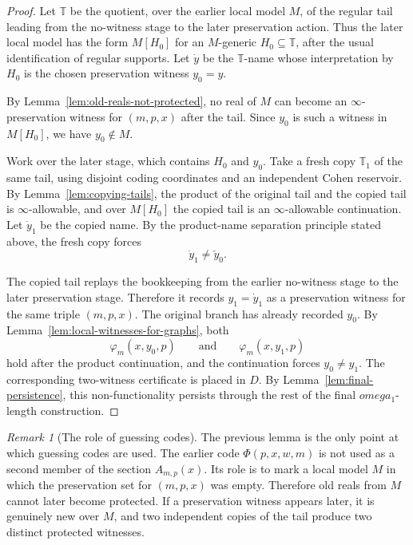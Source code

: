 \documentclass{article}
\theoremstyle{remark}
\newtheorem{remark}[theorem]{Remark}
\theoremstyle{plain}
\def\omega{omega}%
\begin{document}
\begin{proof}
Let $\mathbb T$ be the quotient, over the earlier local model $M$, of the regular
tail leading from the no-witness stage to the later preservation action. Thus
the later local model has the form $M[H_0]$ for an $M$-generic
$H_0\subseteq\mathbb T$, after the usual identification of regular supports. Let
$\dot y$ be the $\mathbb T$-name whose interpretation by $H_0$ is the chosen
preservation witness $y_0=y$.

By Lemma~\ref{lem:old-reals-not-protected}, no real of $M$ can become an
$\infty$-preservation witness for $(m,p,x)$ after the tail. Since $y_0$ is such a
witness in $M[H_0]$, we have $y_0\notin M$.

Work over the later stage, which contains $H_0$ and $y_0$. Take a fresh copy
$\mathbb T_1$ of the same tail, using disjoint coding coordinates and an
independent Cohen reservoir. By Lemma~\ref{lem:copying-tails}, the product of
the original tail and the copied tail is $\infty$-allowable, and over
$M[H_0]$ the copied tail is an $\infty$-allowable continuation. Let $\dot y_1$ be
the copied name. By the product-name separation principle stated above, the fresh copy
forces
\[
   \dot y_1\neq \check y_0.
\]

The copied tail replays the bookkeeping from the earlier no-witness stage to the
later preservation stage. Therefore it records $y_1=\dot y_1$ as a preservation
witness for the same triple $(m,p,x)$. The original branch has already recorded
$y_0$. By Lemma~\ref{lem:local-witnesses-for-graphs}, both
\[
   \varphi_m(x,y_0,p)
   \qquad\text{and}\qquad
   \varphi_m(x,y_1,p)
\]
hold after the product continuation, and the continuation forces
$y_0\neq y_1$. The corresponding two-witness certificate is placed in $D$. By
Lemma~\ref{lem:final-persistence}, this non-functionality persists through the
rest of the final $\omega_1$-length construction.
\end{proof}

\begin{remark}[The role of guessing codes]\label{rem:guessing-codes}
The previous lemma is the only point at which guessing codes are used. The
earlier code $\Phi(p,x,w,m)$ is not used as a second member of the section
$A_{m,p}(x)$. Its role is to mark a local model $M$ in which the preservation set
for $(m,p,x)$ was empty. Therefore old reals from $M$ cannot later become
protected. If a preservation witness appears later, it is genuinely new over
$M$, and two independent copies of the tail produce two distinct protected
witnesses.
\end{remark}
\end{document}
